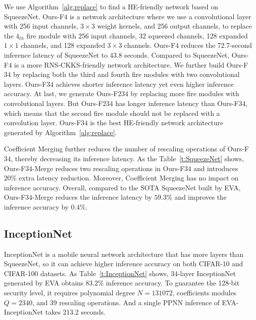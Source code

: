 \documentclass{article}
\begin{document}
	
We use Algorithm~\ref{alg:replace} to find a HE-friendly network based on SqueezeNet. Ours-F$4$ is a network architecture where we use a convolutional layer with 256 input channels, $3\times3$ weight kernels, and 256 output channels, to replace the $4_{th}$ fire module with 256 input channels, $32$ squeezed channels, 128 expanded $1\times 1$ channels, and 128 expanded $3\times 3$ channels. Ours-F$4$ reduces the 72.7-second inference latency of SqueezeNet to 43.8 seconds. Compared to SqueezeNet, Ours-F$4$ is a more RNS-CKKS-friendly network architecture. We further build Ours-F$34$ by replacing both the third and fourth fire modules with two convolutional layers.  Ours-F$34$ achieves shorter inference latency yet even higher inference accuracy. At last, we generate Ours-F$234$ by replacing more fire modules with convolutional layers. But Ours-F$234$ has longer inference latency than Ours-F$34$, which means that the second fire module should not be replaced with a convolution layer. Ours-F$34$ is the best HE-friendly network architecture generated by Algorithm~\ref{alg:replace}. 



Coefficient Merging further reduces the number of rescaling operations of Ours-F$34$, thereby decreasing its inference latency. As the Table~\ref{t:SqueezeNet} shows, Ours-F$34$-Merge reduces two rescaling operations in Ours-F$34$ and introduces $20\%$ extra latency reduction. Moreover, Coefficient Merging has no impact on inference accuracy. Overall, compared to the SOTA SqueezeNet built by EVA, Ours-F$34$-Merge reduces the inference latency by $59.3\%$ and improves the inference accuracy by $0.4\%$.      	
	

















\subsection{InceptionNet}	



InceptionNet is a mobile neural network architecture that has more layers than SqueezeNet, so it can achieve higher inference accuracy on both CIFAR-10 and CIFAR-100 datasets. As Table~\ref{t:InceptionNet} shows, 34-layer InceptionNet generated by EVA obtains $83.2\%$ inference accuracy. To guarantee the 128-bit security level, it requires polynomial degree $N=131072$, coefficients modules $Q=2340$, and 39 rescaling operations. And a single PPNN inference of EVA-InceptionNet takes 213.2 seconds.   
	
\end{document}
